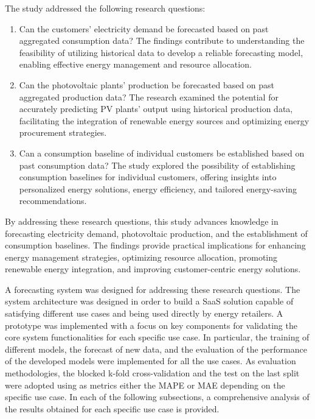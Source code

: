The study addressed the following research questions:
\begin{enumerate}
  \item Can the customers' electricity demand be forecasted based on past aggregated consumption data? The findings contribute to understanding the feasibility of utilizing historical data to develop a reliable forecasting model, enabling effective energy management and resource allocation.
  \item Can the photovoltaic plants' production be forecasted based on past aggregated production data? The research examined the potential for accurately predicting PV plants' output using historical production data, facilitating the integration of renewable energy sources and optimizing energy procurement strategies.
  \item Can a consumption baseline of individual customers be established based on past consumption data? The study explored the possibility of establishing consumption baselines for individual customers, offering insights into personalized energy solutions, energy efficiency, and tailored energy-saving recommendations.
\end{enumerate}
By addressing these research questions, this study advances knowledge in forecasting electricity demand, photovoltaic production, and the establishment of consumption baselines.
The findings provide practical implications for enhancing energy management strategies, optimizing resource allocation, promoting renewable energy integration, and improving customer-centric energy solutions.

A forecasting system was designed for addressing these research questions.
The system architecture was designed in order to build a SaaS solution capable of satisfying different use cases and being used directly by energy retailers.
A prototype was implemented with a focus on key components for validating the core system functionalities for each specific use case.
In particular, the training of different models, the forecast of new data, and the evaluation of the performance of the developed models were implemented for all the use cases.
As evaluation methodologies, the blocked k-fold cross-validation and the test on the last split were adopted using as metrics either the MAPE or MAE depending on the specific use case.
In each of the following subsections, a comprehensive analysis of the results obtained for each specific use case is provided.


\vspace{0.1 cm}
